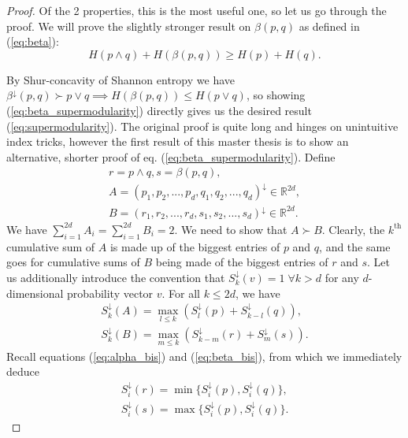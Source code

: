 \begin{proof} \label{proof:alternative_supermodularity}
    Of the 2 properties, this is the most useful one, so let us go through the proof. We will prove the slightly stronger result on $\beta(p, q)$ as defined in (\ref{eq:beta}):
    \begin{equation} \label{eq:beta_supermodularity}
        H(p \wedge q) + H(\beta(p, q)) \geq H(p) + H(q).
    \end{equation}

    By Shur-concavity of Shannon entropy we have $\beta^\downarrow(p, q) \succ p \vee q \implies H(\beta(p, q)) \leq H(p \vee q)$, so showing (\ref{eq:beta_supermodularity}) directly gives us the desired result (\ref{eq:supermodularity}). The original proof is quite long and hinges on unintuitive index tricks, however the first result of this master thesis is to show an alternative, shorter proof of eq. (\ref{eq:beta_supermodularity}). Define
    \begin{gather}
        r = p \wedge q, s = \beta(p, q), \\
        A = (p_1, p_2, ..., p_d, q_1, q_2, ..., q_d)^\downarrow \in \mathbb{R}^{2d}, \\
        B = (r_1, r_2, ..., r_d, s_1, s_2, ..., s_d)^\downarrow \in \mathbb{R}^{2d}.
    \end{gather}
    We have $\sum_{i=1}^{2d} A_i = \sum_{i=1}^{2d} B_i = 2$. We need to show that $A \succ B$. Clearly, the $k^{\text{th}}$ cumulative sum of $A$ is made up of the biggest entries of $p$ and $q$, and the same goes for cumulative sums of $B$ being made of the biggest entries of $r$ and $s$. Let us additionally introduce the convention that $S^\downarrow_k (v) = 1 \; \forall k > d$ for any $d$-dimensional probability vector $v$. For all $k \leq 2d$, we have 
    \begin{gather}
        S^\downarrow_k (A) = \max_{l\leq k} (S^\downarrow_l (p) + S^\downarrow_{k-l} (q)), \\
        S^\downarrow_k (B) = \max_{m\leq k} (S^\downarrow_{k-m} (r)+ S^\downarrow_m (s)).
    \end{gather} %
    Recall equations (\ref{eq:alpha_bis}) and (\ref{eq:beta_bis}), from which we immediately deduce
    \begin{gather}
        S^\downarrow_i (r) = \min \{S^\downarrow_i (p), S^\downarrow_i (q)\}, \\
        S^\downarrow_i (s) = \max \{S^\downarrow_i (p), S^\downarrow_i (q)\}.

\end{gather}
\end{proof}
